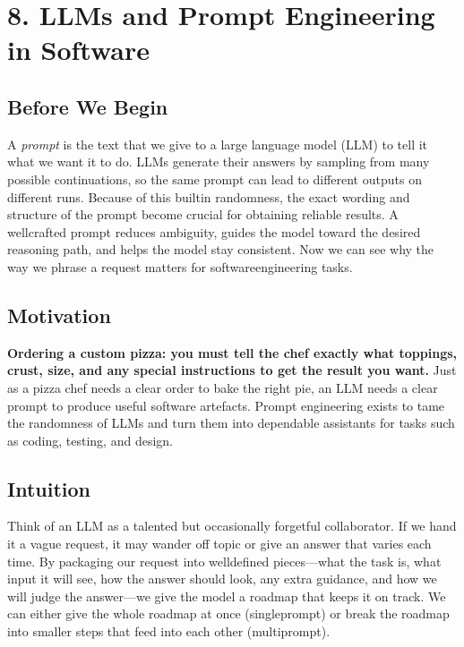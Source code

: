\documentclass[12pt, a4paper]{article}
\begin{document}
\newpage

\section{8. LLMs and Prompt Engineering in Software}

\subsection{Before We Begin}
A \emph{prompt} is the text that we give to a large language model (LLM) to tell it what we want it to do.  
LLMs generate their answers by sampling from many possible continuations, so the same prompt can lead to different outputs on different runs.  
Because of this builtin randomness, the exact wording and structure of the prompt become crucial for obtaining reliable results.  
A wellcrafted prompt reduces ambiguity, guides the model toward the desired reasoning path, and helps the model stay consistent.  
Now we can see why the way we phrase a request matters for softwareengineering tasks.

\subsection{Motivation}
\textbf{Ordering a custom pizza: you must tell the chef exactly what toppings, crust, size, and any special instructions to get the result you want.}  
Just as a pizza chef needs a clear order to bake the right pie, an LLM needs a clear prompt to produce useful software artefacts.  
Prompt engineering exists to tame the randomness of LLMs and turn them into dependable assistants for tasks such as coding, testing, and design.  

\subsection{Intuition}
Think of an LLM as a talented but occasionally forgetful collaborator.  
If we hand it a vague request, it may wander off topic or give an answer that varies each time.  
By packaging our request into welldefined pieces---what the task is, what input it will see, how the answer should look, any extra guidance, and how we will judge the answer---we give the model a roadmap that keeps it on track.  
We can either give the whole roadmap at once (singleprompt) or break the roadmap into smaller steps that feed into each other (multiprompt).  
\end{document}

